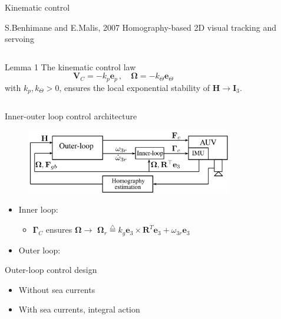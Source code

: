 \documentclass{beamer}
\begin{document}
\begin{frame}{Kinematic control}
	\begin{block}{S.Benhimane and E.Malis, 2007}
		Homography-based 2D visual tracking and servoing
	\end{block}
	\begin{columns}
		\begin{block}{Lemma 1}
			The kinematic control law
			\begin{equation*}\label{maliscontrol}
			\mathbf{V}_{C} = -k_p \mathbf{e}_p\,,\quad \mathbf{\Omega} = -k_\Theta \mathbf{e}_\Theta  
			\end{equation*}
			with $k_p, k_\Theta>0$, ensures the local exponential stability of $\mathbf{H}  \longrightarrow \mathbf{I}_3$.
		\end{block}
	\end{columns}
\end{frame}




\begin{frame}{Inner-outer loop control architecture}
\begin{figure}
	\includegraphics[width = 90mm]{Images/Block_diagram_2.png}
\end{figure}


\begin{itemize}
	\item Inner loop:
	\begin{itemize}
	
		\item $\mathbf{\Gamma}_C$ ensures  $ \mathbf{\Omega} \longrightarrow $ $ \mathbf{\Omega}_r \stackrel{\triangle}{=}  k_g \mathbf{e}_3 \times \mathbf{R}^{T} \mathbf{e}_3 + \omega_{3r} \mathbf{e}_3$ 
	\end{itemize} 
	\item Outer loop:
\end{itemize}
\end{frame}

\begin{frame}{Outer-loop control design}
\begin{itemize}
	\item Without sea currents
	
	\item With sea currents, integral action
\end{itemize}

\end{frame}
\end{document}
